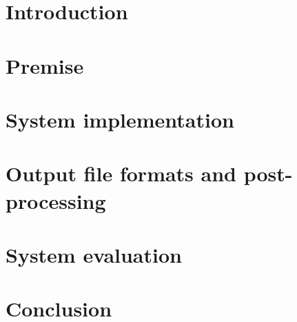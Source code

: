\documentclass[english, numeric, fleqn]{tauthesis}
\begin{document}
\tableofcontents


\printglossary[type=abbreviations]
\printglossary[type=symbols]


\mainmatter

\chapter{Introduction}
\label{ch:1-introduction}


\chapter{Premise}
\label{ch:2-premise}


\chapter{System implementation}
\label{ch:3-system}


\chapter{Output file formats and post-processing}
\label{ch:4-files-and-post}


\chapter{System evaluation}
\label{ch:5-evaluation}


\chapter{Conclusion}
\label{ch:6-conclusion}


\printbibliography[heading=bibintoc]

\end{document}
